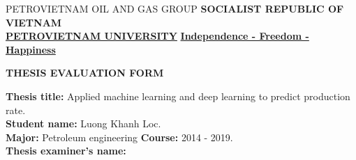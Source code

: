 \documentclass[12pt,a4paper]{report}
\begin{document}
\newpage
\begingroup
\fontsize{10pt}{12pt}\selectfont
PETROVIETNAM OIL AND GAS GROUP \hspace*{1.5cm} \textbf{SOCIALIST REPUBLIC OF VIETNAM}\\
\hspace*{0.5cm}\underline{\textbf{PETROVIETNAM UNIVERSITY}} \hspace*{2.4cm} \underline{\textbf{Independence - Freedom - Happiness}}
\endgroup

\begin{center}
	\centering
	\textbf{THESIS EVALUATION FORM}\\
\end{center}

\textbf{Thesis title:} Applied machine learning and deep learning to predict production rate.\\
\textbf{Student name:} Luong Khanh Loc.\\
\textbf{Major:} Petroleum engineering \hspace*{3cm}\textbf{Course:} 2014 - 2019.\\
\textbf{Thesis examiner's name:}
\newline
\end{document}
